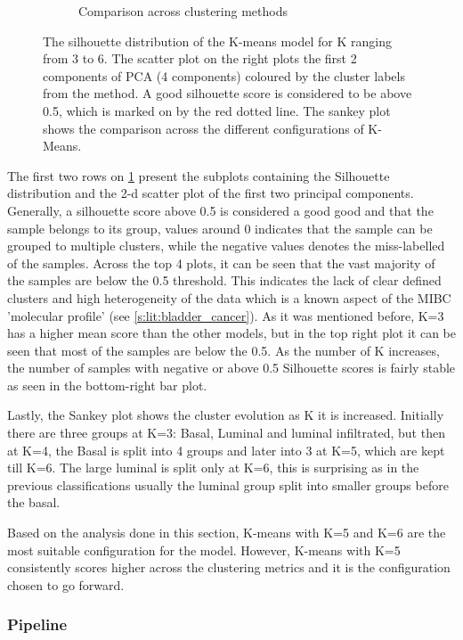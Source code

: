 \begin{figure}[H]
\begin{subfigure}[!t]{0.65\textwidth}
        \caption{Comparison across clustering methods}
    \end{subfigure}
    \centering
    \caption{The silhouette distribution of the K-means model for K ranging from 3 to 6. The scatter plot on the right plots the first 2 components of PCA (4 components) coloured by the cluster labels from the method. A good silhouette score is considered to be above 0.5, which is marked on by the red dotted line. The sankey plot shows the comparison across the different configurations of K-Means.}
    \label{fig:cs:sill_distrib}
\end{figure}


The first two rows on \cref{fig:cs:sill_distrib} present the subplots containing the Silhouette distribution and the 2-d scatter plot of the first two principal components. Generally, a silhouette score above 0.5 is considered a good good and that the sample belongs to its group, values around 0 indicates that the sample can be grouped to multiple clusters, while the negative values denotes the miss-labelled of the samples. Across the top 4 plots, it can be seen that the vast majority of the samples are below the 0.5 threshold. This indicates the lack of clear defined clusters and high heterogeneity of the data which is a known aspect of the MIBC 'molecular profile' (see \cref{s:lit:bladder_cancer}). As it was mentioned before, K=3 has a higher mean score than the other models, but in the top right plot it can be seen that most of the samples are below the 0.5. As the number of K increases, the number of samples with negative or above 0.5 Silhouette scores is fairly stable as seen in the bottom-right bar plot. 

Lastly, the Sankey plot shows the cluster evolution as K it is increased. Initially there are three groups at K=3: Basal, Luminal and luminal infiltrated, but then at K=4, the Basal is split into 4 groups and later into 3 at K=5, which are kept till K=6. The large luminal is split only at K=6, this is surprising as in the previous classifications usually the luminal group split into smaller groups before the basal.

Based on the analysis done in this section, K-means with K=5 and K=6 are the most suitable configuration for the model. However, K-means with K=5 consistently scores higher across the clustering metrics and it is the configuration chosen to go forward.

\subsubsection{Pipeline}

